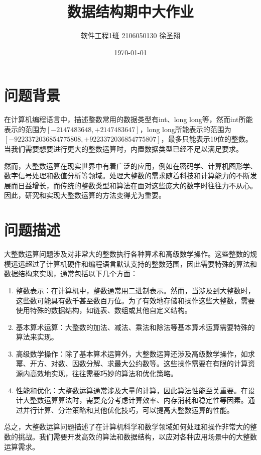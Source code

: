 \documentclass{article}
\title{数据结构期中大作业}
\author{软件工程1班 2106050130 徐圣翔}
\date{\today}
\begin{document}
\maketitle

\graphicspath{{picture/}}

\newpage
\tableofcontents
\newpage

\section{问题背景}
在计算机编程语言中，描述整数常用的数据类型有int、long long等，然而int所能表示的范围为$[-2147483648,+2147483647]$，long long所能表示的范围为$[-9223372036854775808,+9223372036854775807]$，最多只能表示19位的整数。当我们需要想要进行更大的整数运算时，内置数据类型已经不足以满足要求。

然而，大整数运算在现实世界中有着广泛的应用，例如在密码学、计算机图形学、数字信号处理和数值分析等领域。处理大整数的需求随着科技和计算能力的不断发展而日益增长，而传统的整数类型和算法在面对这些庞大的数字时往往力不从心。因此，研究和实现大整数运算的方法变得尤为重要。

\section{问题描述}
大整数运算问题涉及对非常大的整数执行各种算术和高级数学操作。这些整数的规模远远超过了计算机硬件和编程语言默认支持的整数范围，因此需要特殊的算法和数据结构来实现，通常包括以下几个方面：

\begin{enumerate}
    \item 整数表示：在计算机中，整数通常用二进制表示。然而，当涉及到大整数时，这些数可能具有数千甚至数百万位。为了有效地存储和操作这些大整数，需要使用特殊的数据结构，如链表、数组或其他自定义结构。
    \item 基本算术运算：大整数的加法、减法、乘法和除法等基本算术运算需要特殊的算法来实现。
    \item 高级数学操作：除了基本算术运算外，大整数运算还涉及高级数学操作，如求幂、开方、对数、因数分解、求最大公约数等。这些操作需要在有限的计算资源内高效地实现，往往需要巧妙的算法和优化策略。
    \item 性能和优化：大整数运算通常涉及大量的计算，因此算法性能至关重要。在设计大整数运算算法时，需要充分考虑计算效率、内存消耗和稳定性等因素。通过并行计算、分治策略和其他优化技巧，可以提高大整数运算的性能。
\end{enumerate}

总之，大整数运算问题描述了在计算机科学和数学领域如何处理和操作非常大的整数的挑战。我们需要开发高效的算法和数据结构，以应对各种应用场景中的大整数运算需求。
\end{document}
